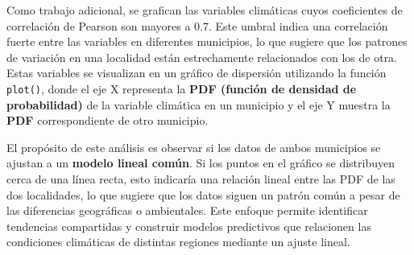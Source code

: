 \documentclass[11pt]{article}
\begin{document}
    Como trabajo adicional, se grafican las variables climáticas cuyos
coeficientes de correlación de Pearson son mayores a 0.7. Este umbral
indica una correlación fuerte entre las variables en diferentes
municipios, lo que sugiere que los patrones de variación en una
localidad están estrechamente relacionados con los de otra. Estas
variables se visualizan en un gráfico de dispersión utilizando la
función \texttt{plot()}, donde el eje X representa la \textbf{PDF
(función de densidad de probabilidad)} de la variable climática en un
municipio y el eje Y muestra la \textbf{PDF} correspondiente de otro
municipio.

El propósito de este análisis es observar si los datos de ambos
municipios se ajustan a un \textbf{modelo lineal común}. Si los puntos
en el gráfico se distribuyen cerca de una línea recta, esto indicaría
una relación lineal entre las PDF de las dos localidades, lo que sugiere
que los datos siguen un patrón común a pesar de las diferencias
geográficas o ambientales. Este enfoque permite identificar tendencias
compartidas y construir modelos predictivos que relacionen las
condiciones climáticas de distintas regiones mediante un ajuste lineal.
\end{document}

